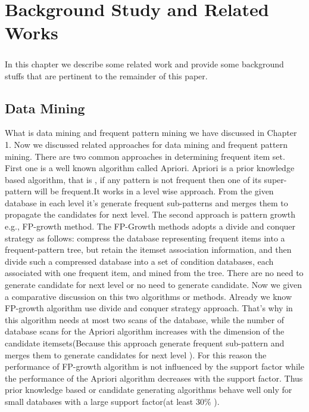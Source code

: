 %
\newpage

\chapter{Background Study and Related Works}
\paragraph{}
In this chapter we describe some related work and provide some background stuffs that are  pertinent to the remainder of this paper.
\section{Data Mining}
What is data mining and frequent pattern mining we have discussed in Chapter 1. Now we discussed related approaches for data mining and frequent pattern mining. There are two common approaches in determining frequent item set. First one is a well known algorithm called Apriori. Apriori is a prior knowledge based  algorithm, that is , if any pattern is not frequent then one of its super-pattern will be frequent.It works in a level wise approach. From the given database in each level it's generate frequent sub-patterns and merges them to propagate the candidates for next level. The second approach is pattern growth e.g., FP-growth method. The FP-Growth methods adopts a divide and conquer strategy as follows: compress the database representing frequent items into a frequent-pattern tree, but retain the itemset association information, and then divide such a compressed database into a set of condition databases, each associated with one frequent item, and mined from the tree. There are no need to generate candidate for next level or no need to generate candidate. Now we given a comparative discussion on this two algorithms or methods. Already we know FP-growth algorithm use divide and conquer strategy approach. That's why in this algorithm needs at most two scans of the database, while the number of database scans for the Apriori algorithm increases with the dimension of the candidate itemsets(Because this approach generate frequent sub-pattern and merges them to generate candidates for next level ). For this reason the performance of FP-growth algorithm is not influenced by the support factor while the performance of the Apriori algorithm decreases with the support factor. Thus prior knowledge based or candidate generating algorithms behave well only for small databases with a large support factor(at least 30\% ).

